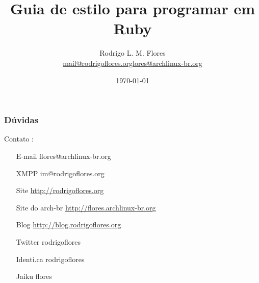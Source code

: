 \documentclass{beamer}
\title{Guia de estilo para programar em Ruby}
\author{Rodrigo L. M. Flores \\ \url{mail@rodrigoflores.orglores@archlinux-br.org}}
\institute{Projeto Archlinux-BR}
\begin{document}
\date{\today}

\frame{\titlepage}

\begin{frame}
    \frametitle{Dúvidas}
    \begin{block}{Contato :}
        \begin{itemize}
            \centering
            \item[E-mail] flores@archlinux-br.org        
            \item[XMPP]  im@rodrigoflores.org        
            \item[Site]  \url{http://rodrigoflores.org}
            \item[Site do arch-br]  \url{http://flores.archlinux-br.org}
            \item[Blog]  \url{http://blog.rodrigoflores.org}        
            \item[Twitter] rodrigoflores        
            \item[Identi.ca] rodrigoflores        
            \item[Jaiku] flores        
        \end{itemize}
    \end{block}

\end{frame}
\end{document}
